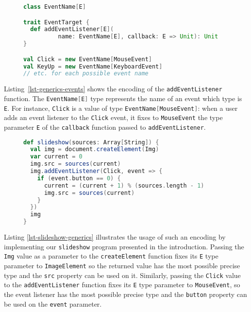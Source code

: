 \documentclass{llncs}
\newcommand{\jscode}[1]{\lstinline[language=JavaScript]|#1|}
\newcommand{\scalacode}[1]{\lstinline[language=Scala]|#1|}
\begin{document}
\begin{figure}
\begin{lstlisting}[label=lst-generics-events,language=Scala,caption={Encoding of the \jscode{addEventListener} function using type parameters}]
class EventName[E]

trait EventTarget {
  def addEventListener[E](
          name: EventName[E], callback: E => Unit): Unit
}

val Click = new EventName[MouseEvent]
val KeyUp = new EventName[KeyboardEvent]
// etc. for each possible event name
\end{lstlisting}
\end{figure}

Listing~\ref{lst-generics-events} shows the encoding of the \jscode{addEventListener} function. The \scalacode{EventName[E]} type represents the name of an event which type is \scalacode{E}. For instance, \scalacode{Click} is a value of type \scalacode{EventName[MouseEvent]}: when a user adds an event listener to the \scalacode{Click} event, it fixes to \scalacode{MouseEvent} the type parameter \scalacode{E} of the \scalacode{callback} function passed to \scalacode{addEventListener}.

\begin{figure}
\begin{lstlisting}[label=lst-slideshow-generics,language=Scala,caption={Scala implementation of the \texttt{slideshow} function using generics}]
def slideshow(sources: Array[String]) {
  val img = document.createElement(Img)
  var current = 0
  img.src = sources(current)
  img.addEventListener(Click, event => {
    if (event.button == 0) {
      current = (current + 1) % (sources.length - 1)
      img.src = sources(current)
    }
  })
  img
}
\end{lstlisting}
\end{figure}

Listing \ref{lst-slideshow-generics} illustrates the usage of such an encoding by implementing our \texttt{slideshow} program presented in the introduction. Passing the \scalacode{Img} value as a parameter to the \scalacode{createElement} function fixes its \scalacode{E} type parameter to \scalacode{ImageElement} so the returned value has the most possible precise type and the \scalacode{src} property can be used on it. Similarly, passing the \scalacode{Click} value to the \scalacode{addEventListener} function fixes its \scalacode{E} type parameter to \scalacode{MouseEvent}, so the event listener has the most possible precise type and the \scalacode{button} property can be used on the \scalacode{event} parameter.
\end{document}
